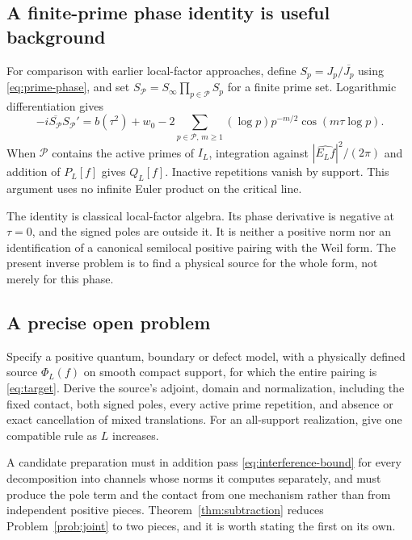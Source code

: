 \subsection{A finite-prime phase identity is useful background}
For comparison with earlier local-factor approaches, define
$S_p=J_p/\overline{J_p}$ using \eqref{eq:prime-phase}, and set
$S_{\mathcal P}=S_\infty\prod_{p\in\mathcal P}S_p$ for a finite prime
set. Logarithmic differentiation gives
\begin{equation}\label{eq:finite-phase}
 -i\overline{S_{\mathcal P}}S_{\mathcal P}'
 =b(\tau^2)+w_0
 -2\sum_{p\in\mathcal P,\,m\geq1}(\log p)p^{-m/2}
                         \cos(m\tau\log p).
\end{equation}
When $\mathcal P$ contains the active primes of $I_L$, integration
against $|\widehat{E_Lf}|^2/(2\pi)$ and addition of $P_L[f]$ gives
$Q_L[f]$. Inactive repetitions vanish by support. This argument uses
no infinite Euler product on the critical line.

The identity is classical local-factor algebra. Its phase derivative
is negative at $\tau=0$, and the signed poles are outside it. It is
neither a positive norm nor an identification of a canonical semilocal
positive pairing with the Weil form. The present inverse problem is
to find a physical source for the whole form, not merely for this phase.

\subsection{A precise open problem}
\begin{problem}\label{prob:joint}
Specify a positive quantum, boundary or defect model, with a physically
defined source $\Phi_L(f)$ on smooth compact support, for which the
entire pairing is \eqref{eq:target}. Derive the source's adjoint,
domain and normalization, including the fixed contact, both signed
poles, every active prime repetition, and absence or exact cancellation
of mixed translations. For an all-support realization, give one
compatible rule as $L$ increases.
\end{problem}

A candidate preparation must in addition pass
\eqref{eq:interference-bound} for every decomposition into channels whose
norms it computes separately, and must produce the pole term and the
contact from one mechanism rather than from independent positive pieces.
Theorem~\ref{thm:subtraction} reduces Problem~\ref{prob:joint} to two
pieces, and it is worth stating the first on its own.

